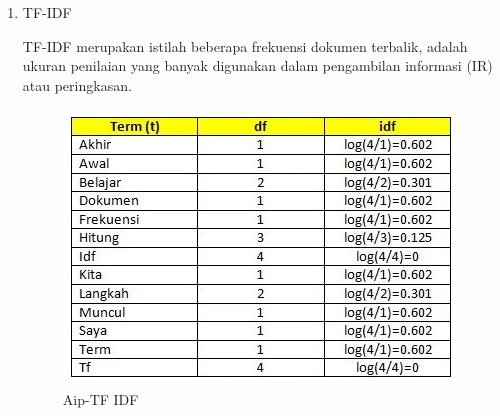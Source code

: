 \begin{enumerate}
\item TF-IDF
	\par TF-IDF merupakan istilah beberapa frekuensi dokumen terbalik, adalah ukuran penilaian yang banyak digunakan dalam pengambilan informasi (IR) atau peringkasan. 
	\begin{figure}[ht]
		\centering
		\includegraphics[scale=0.5]{figures/AIP/b5.PNG}
		\caption{Aip-TF IDF}
		\label{contoh}
	\end{figure}
\end{enumerate}